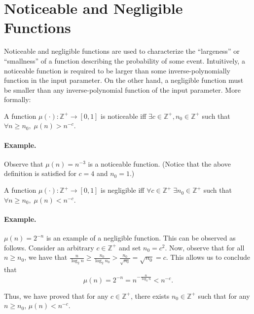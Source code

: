 \section{Noticeable and Negligible Functions}
\label{ssec:nnf}
Noticeable and negligible functions are used to characterize the ``largeness'' or ``smallness'' of a function describing the probability of some event.  Intuitively, a noticeable function is required to be larger than some inverse-polynomially function in the input parameter. On the other hand, a negligible function must be smaller than any inverse-polynomial function of the input parameter. More formally:


\begin{definition}
A function $\mu(\cdot): \mathbb{Z}^+ \rightarrow [0,1]$ is noticeable iff $\exists c \in \mathbb{Z}^+, n_0 \in \mathbb{Z}^+$ such that $\forall n \geq n_0 , \; \mu(n) > n^{-c}$.
\end{definition}

\paragraph{Example.} Observe that $\mu(n) = n^{-3}$ is a noticeable function.  (Notice that the above definition is satisfied for $c = 4$ and $n_0 = 1$.)

\begin{definition}
A function $\mu(\cdot): \mathbb{Z}^+ \rightarrow [0,1]$ is negligible iff $\forall c \in \mathbb{Z}^+ \; \exists n_0 \in \mathbb{Z}^+$ such that $\forall n \geq n_0 , \; \mu(n) < n^{-c}$.
\end{definition}

\paragraph{Example.} $\mu(n) = 2^{-n}$ is an example of a negligible function. This can be observed as follows.
Consider an arbitrary $c \in \mathbb{Z}^+$ and set $n_0 = c^2$. Now, observe that for all $n \geq n_0$, we have that $\frac{n}{\log_2 n} \geq \frac{n_0}{\log_2 n_0} > \frac{n_0}{\sqrt{n_0}} = \sqrt{n_0} = c$. This allows us to conclude that $$\mu(n) = 2^{-n} = n^{-\frac{n}{\log_2 n}} < n^{-c}.$$

Thus, we have proved that for any $c \in \mathbb{Z}^+$, there exists $n_0 \in \mathbb{Z}^+$ such that for any $n \geq n_0$, $\mu(n) < n^{-c}$.

